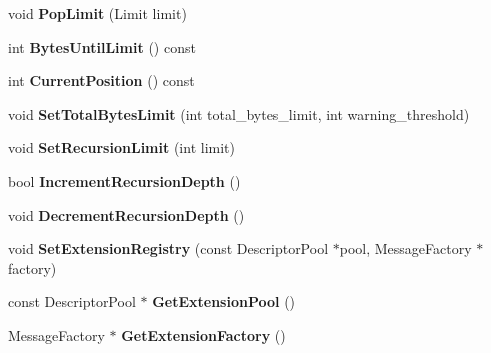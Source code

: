 \begin{DoxyCompactItemize}
void {\bfseries Pop\+Limit} (Limit limit)
\item 
\mbox{\label{classgoogle_1_1protobuf_1_1io_1_1CodedInputStream_a8068fb0d746b305433ce3490a1edb59e}} 
int {\bfseries Bytes\+Until\+Limit} () const
\item 
\mbox{\label{classgoogle_1_1protobuf_1_1io_1_1CodedInputStream_a09cefb6a92d21847384f43ce2470c151}} 
int {\bfseries Current\+Position} () const
\item 
\mbox{\label{classgoogle_1_1protobuf_1_1io_1_1CodedInputStream_a98cb2741214e8d5a36d035363bd92637}} 
void {\bfseries Set\+Total\+Bytes\+Limit} (int total\+\_\+bytes\+\_\+limit, int warning\+\_\+threshold)
\item 
\mbox{\label{classgoogle_1_1protobuf_1_1io_1_1CodedInputStream_a8baa813503e44b6bf2e78191cfd16261}} 
void {\bfseries Set\+Recursion\+Limit} (int limit)
\item 
\mbox{\label{classgoogle_1_1protobuf_1_1io_1_1CodedInputStream_aa378da875bec7f2a1c9e09a9d37f3672}} 
bool {\bfseries Increment\+Recursion\+Depth} ()
\item 
\mbox{\label{classgoogle_1_1protobuf_1_1io_1_1CodedInputStream_aabc8f94b211fcf84fa2fdea15777d481}} 
void {\bfseries Decrement\+Recursion\+Depth} ()
\item 
\mbox{\label{classgoogle_1_1protobuf_1_1io_1_1CodedInputStream_a41c67ddbefe2d3911bdc921a1b9d4635}} 
void {\bfseries Set\+Extension\+Registry} (const Descriptor\+Pool $\ast$pool, Message\+Factory $\ast$factory)
\item 
\mbox{\label{classgoogle_1_1protobuf_1_1io_1_1CodedInputStream_a0bb0d88c2d9e610fb6a51fba82e20e9c}} 
const Descriptor\+Pool $\ast$ {\bfseries Get\+Extension\+Pool} ()
\item 
\mbox{\label{classgoogle_1_1protobuf_1_1io_1_1CodedInputStream_a2325481edaa5d617bb393da7ab7fefc8}} 
Message\+Factory $\ast$ {\bfseries Get\+Extension\+Factory} ()
\end{DoxyCompactItemize}
